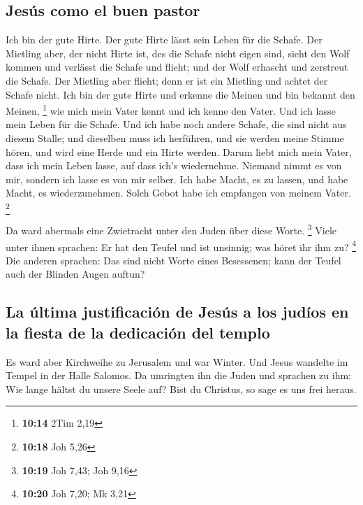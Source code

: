 \hypertarget{jesuxfas-como-el-buen-pastor}{%
\subsection{Jesús como el buen
pastor}\label{jesuxfas-como-el-buen-pastor}}

 Ich bin der gute Hirte. Der gute Hirte lässt sein Leben
für die Schafe.  Der Mietling aber, der nicht Hirte ist,
des die Schafe nicht eigen sind, sieht den Wolf kommen und verlässt die
Schafe und flieht; und der Wolf erhascht und zerstreut die Schafe.
 Der Mietling aber flieht; denn er ist ein Mietling und
achtet der Schafe nicht.  Ich bin der gute Hirte und
erkenne die Meinen und bin bekannt den Meinen, \footnote{\textbf{10:14}
  2Tim 2,19}  wie mich mein Vater kennt und ich kenne den
Vater. Und ich lasse mein Leben für die Schafe.  Und ich
habe noch andere Schafe, die sind nicht aus diesem Stalle; und dieselben
muss ich herführen, und sie werden meine Stimme hören, und wird eine
Herde und ein Hirte werden.  Darum liebt mich mein Vater,
dass ich mein Leben lasse, auf dass ich's wiedernehme. 
Niemand nimmt es von mir, sondern ich lasse es von mir selber. Ich habe
Macht, es zu lassen, und habe Macht, es wiederzunehmen. Solch Gebot habe
ich empfangen von meinem Vater. \footnote{\textbf{10:18} Joh 5,26}

 Da ward abermals eine Zwietracht unter den Juden über
diese Worte. \footnote{\textbf{10:19} Joh 7,43; Joh 9,16}
 Viele unter ihnen sprachen: Er hat den Teufel und ist
unsinnig; was höret ihr ihm zu? \footnote{\textbf{10:20} Joh 7,20; Mk
  3,21}  Die anderen sprachen: Das sind nicht Worte eines
Besessenen; kann der Teufel auch der Blinden Augen auftun?

\hypertarget{la-uxfaltima-justificaciuxf3n-de-jesuxfas-a-los-juduxedos-en-la-fiesta-de-la-dedicaciuxf3n-del-templo}{%
\subsection{La última justificación de Jesús a los judíos en la fiesta
de la dedicación del
templo}\label{la-uxfaltima-justificaciuxf3n-de-jesuxfas-a-los-juduxedos-en-la-fiesta-de-la-dedicaciuxf3n-del-templo}}

 Es ward aber Kirchweihe zu Jerusalem und war Winter.
 Und Jesus wandelte im Tempel in der Halle Salomos.
 Da umringten ihn die Juden und sprachen zu ihm: Wie
lange hältst du unsere Seele auf? Bist du Christus, so sage es uns frei
heraus.

